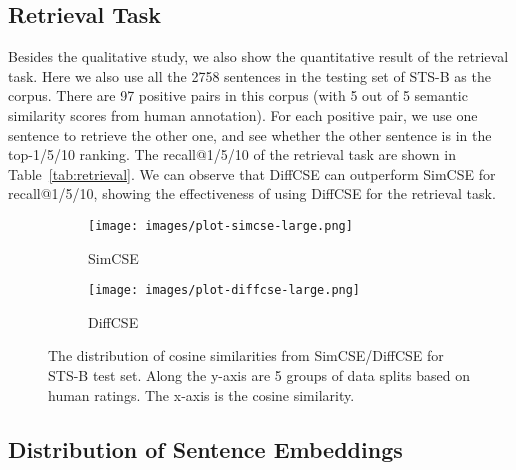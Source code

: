 \documentclass[11pt]{article}
\begin{document}
\subsection{Retrieval Task}
Besides the qualitative study, we also show the quantitative result of the retrieval task. Here we also use all the 2758 sentences in the testing set of STS-B as the corpus. There are 97 positive pairs in this corpus (with 5 out of 5 semantic similarity scores from human annotation). For each positive pair, we use one sentence to retrieve the other one, and see whether the other sentence is in the top-1/5/10 ranking. The recall@1/5/10 of the retrieval task are shown in Table~\ref{tab:retrieval}.
We can observe that DiffCSE can outperform SimCSE for recall@1/5/10, showing the effectiveness of using DiffCSE for the retrieval task.

\begin{figure}[t!]
    \centering
    \begin{subfigure}{\columnwidth}
        \texttt{[image: images/plot-simcse-large.png]}
        \caption{SimCSE}
        \label{fig:plot-dist-simcse}
        \end{subfigure}
    \begin{subfigure}{\columnwidth}
        \texttt{[image: images/plot-diffcse-large.png]}
        \caption{DiffCSE}
        \label{fig:plot-dist-diffcse}
    \end{subfigure}
    \vspace{-2mm}
    \caption{The distribution of cosine similarities from SimCSE/DiffCSE for STS-B test set. Along the y-axis are 5 groups of data splits based on human ratings. The x-axis is the cosine similarity.}
    \label{fig:plot-dist}
    \vspace{-3mm}
\end{figure}


\subsection{Distribution of Sentence Embeddings}
\end{document}
